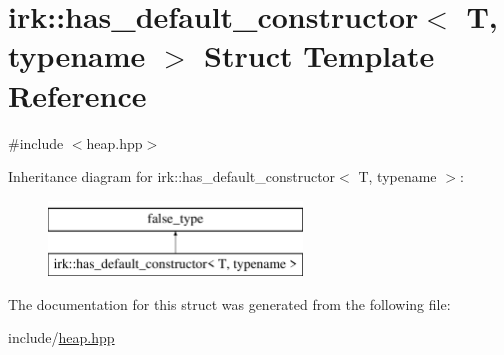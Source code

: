 \hypertarget{structirk_1_1has__default__constructor}{}\section{irk\+:\+:has\+\_\+default\+\_\+constructor$<$ T, typename $>$ Struct Template Reference}
\label{structirk_1_1has__default__constructor}


{\ttfamily \#include $<$heap.\+hpp$>$}

Inheritance diagram for irk\+:\+:has\+\_\+default\+\_\+constructor$<$ T, typename $>$\+:\begin{figure}[H]
\begin{center}
\leavevmode
\includegraphics[height=2.000000cm]{structirk_1_1has__default__constructor}
\end{center}
\end{figure}


The documentation for this struct was generated from the following file\+:\begin{DoxyCompactItemize}
\item 
include/\mbox{\hyperlink{heap_8hpp}{heap.\+hpp}}\end{DoxyCompactItemize}
